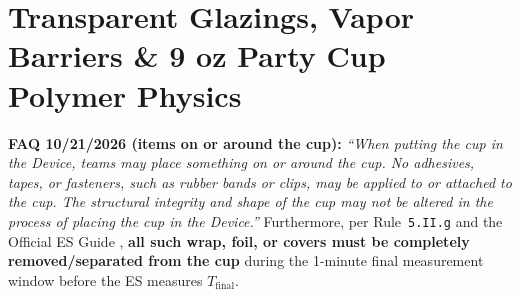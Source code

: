 \section{Transparent Glazings, Vapor Barriers \& 9 oz Party Cup Polymer Physics}\label{sec:14.4}

\begin{rulebox}
\textbf{FAQ 10/21/2026 (items on or around the cup):} \textit{``When putting the cup in the Device, teams may place something on or around the cup. No adhesives, tapes, or fasteners, such as rubber bands or clips, may be applied to or attached to the cup. The structural integrity and shape of the cup may not be altered in the process of placing the cup in the Device.''} Furthermore, per Rule~\texttt{5.II.g} and the Official ES Guide , \textbf{all such wrap, foil, or covers must be completely removed/separated from the cup} during the 1-minute final measurement window before the ES measures $T_{\mathrm{final}}$.
\end{rulebox}

